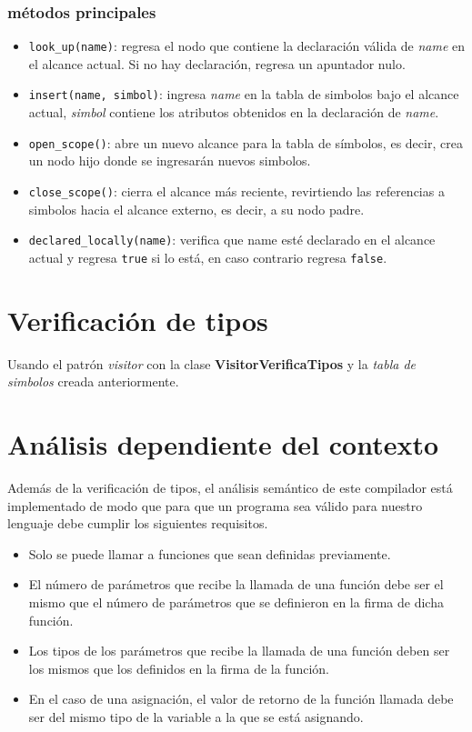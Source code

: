 \documentclass[12pt]{article}
\begin{document}
\subsubsection{métodos principales}
\begin{itemize}
\item \texttt{look\_up(name)}: regresa el nodo que contiene la declaración válida de \emph{name} en el alcance actual. Si no hay declaración, regresa un apuntador nulo.
\item \texttt{insert(name, simbol)}: ingresa \emph{name} en la tabla de simbolos bajo el alcance actual, \emph{simbol} contiene los atributos obtenidos en la declaración de \emph{name}.
\item \texttt{open\_scope()}: abre un nuevo alcance para la tabla de símbolos, es decir, crea un nodo hijo donde se ingresarán nuevos simbolos.
\item \texttt{close\_scope()}: cierra el alcance más reciente, revirtiendo las referencias a simbolos hacia el alcance externo, es decir, a su nodo padre.
\item \texttt{declared\_locally(name)}: verifica que name esté declarado en el alcance actual y regresa \texttt{true} si lo está, en caso contrario regresa \texttt{false}.
\end{itemize}
\section{Verificación de tipos}
Usando el patrón \textit{visitor} con la clase \textbf{VisitorVerificaTipos} y la \textit{tabla de simbolos} creada anteriormente.
\section{Análisis dependiente del contexto}
Además de la verificación de tipos, el análisis semántico de este compilador está implementado de modo que para que un programa sea válido para nuestro lenguaje debe cumplir los siguientes requisitos.
\begin{itemize}
\item Solo se puede llamar a funciones que sean definidas previamente.
\item El número de parámetros que recibe la llamada de una función debe ser el mismo que el número de parámetros que se definieron en la firma de dicha función.
\item Los tipos de los parámetros que recibe la llamada de una función deben ser los mismos que los definidos en la firma de la función.
\item En el caso de una asignación, el valor de retorno de la función llamada debe ser del mismo tipo de la variable a la que se está asignando. 
\end{itemize}
\end{document}
